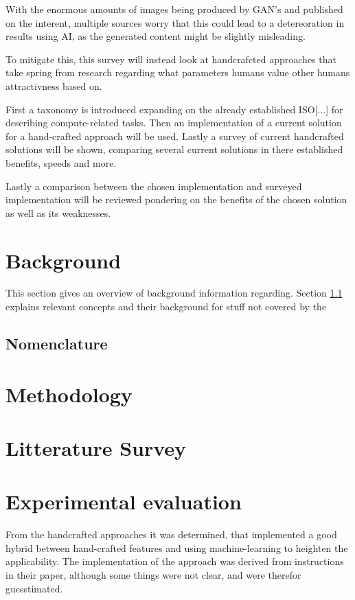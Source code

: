 \documentclass[english]{lni}
\begin{document}
With the enormous amounts of images being produced by GAN's and published on the interent, multiple sources worry that this could lead to a detereoration in results using AI, as the generated content might be slightly misleading.

To mitigate this, this survey will instead look at handcrafcted approaches that take spring from research regarding what parameters humans value other humans attractivness based on.

First a taxonomy is introduced expanding on the already established ISO[...] for describing compute-related tasks. Then an implementation of a current solution for a hand-crafted approach will be used. Lastly a survey of current handcrafted solutions will be shown, comparing several current solutions in there established benefits, speeds and more.

Lastly a comparison between the chosen implementation and surveyed implementation will be reviewed pondering on the benefits of the chosen solution as well as its weaknesses.

\section{Background}
This section gives an overview of background information regarding. Section \ref{nomenclature} explains relevant concepts and their background for stuff not covered by the 
\subsection{Nomenclature}\label{nomenclature}

\section{Methodology}
\section{Litterature Survey}
\section{Experimental evaluation}
From the handcrafted approaches it was determined, that \cite[]{j_iyer_machine_2021} implemented a good hybrid between hand-crafted features and using machine-learning to heighten the applicability.
The implementation of the approach was derived from instructions in their paper, although some things were not clear, and were therefor guesstimated.
\end{document}
